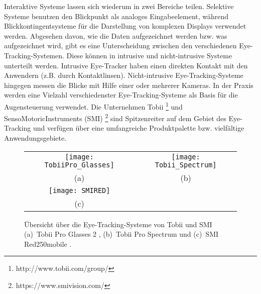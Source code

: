 \newline \newline
Interaktive Systeme lassen sich wiederum in zwei Bereiche teilen. Selektive Systeme benutzen den Blickpunkt als analoges Eingabeelement, während Blickkontingentsysteme für die Darstellung von komplexen Displays verwendet werden. 
\newline \newline
Abgesehen davon, wie die Daten aufgezeichnet werden bzw. was aufgezeichnet wird, gibt es eine Unterscheidung zwischen den verschiedenen Eye-Tracking-Systemen. Diese können in intrusive und nicht-intrusive Systeme unterteilt werden. Intrusive Eye-Tracker haben einen direkten Kontakt mit den Anwendern (z.B. durch Kontaktlinsen). Nicht-intrusive Eye-Tracking-Systeme hingegen messen die Blicke mit Hilfe einer oder mehrerer Kameras. 
\newline \newline
In der Praxis werden eine Vielzahl verschiedenster Eye-Tracking-Systeme als Basis für die Augensteuerung verwendet. Die Unternehmen Tobii%
\footnote{http://www.tobii.com/group/}
%
und SensoMotoricInstruments (SMI)%
\footnote{https://www.smivision.com/}
%
sind Spitzenreiter auf dem Gebiet des Eye-Tracking und verfügen über eine umfangreiche Produktpalette bzw. vielfältige Anwendungsgebiete. 
\begin{figure}
\centering\small
\setlength{\tabcolsep}{0mm}	%
\begin{tabular}{c@{\hspace{-15mm}}c} %
  \texttt{[image: TobiiPro\_Glasses]} &
  \texttt{[image: Tobii\_Spectrum]}
\\
  (a) & (b)
\\[4pt]	%
  \texttt{[image: SMIRED]}
\\
  (c)
\end{tabular}
%
\caption{Übersicht über die Eye-Tracking-Systeme von Tobii und SMI \newline
(a)~Tobii Pro Glasses 2 \cite{TobiiGlasses}, (b)~Tobii Pro Spectrum \cite{TobiiSpectrum} und (c)~SMI Red250mobile \cite{SMIRED}.}
\label{fig:Tobii}
\end{figure}
\newline \newline
